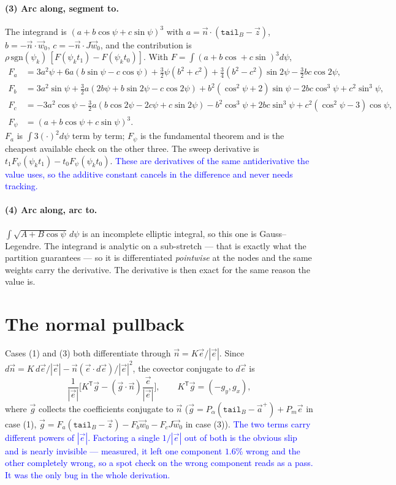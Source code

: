 \documentclass[11pt]{article}
\newcommand{\vv}[1]{\vec{#1}}
\newcommand{\code}[1]{\texttt{#1}}
\newcommand{\note}[1]{\textcolor{blue}{#1}}
\begin{document}
\paragraph{(3) Arc along, segment to.} The integrand is
$(a+b\cos\psi+c\sin\psi)^3$ with $a=\vv n\cdot(\code{tail}_B-\vv z)$, $b=-\vv n\cdot\vv w_0$,
$c=-\vv n\cdot J\vv w_0$, and the contribution is $\rho\,\mathrm{sgn}(\psi_k)\,[F(\psi_kt_1)-F(\psi_kt_0)]$.
With $F=\int(a+b\cos+c\sin)^3d\psi$,
\begin{align}
  F_a&=3a^2\psi+6a(b\sin\psi-c\cos\psi)+\tfrac32\psi(b^2+c^2)
       +\tfrac34(b^2-c^2)\sin2\psi-\tfrac32 bc\cos2\psi,\\
  F_b&=3a^2\sin\psi+\tfrac32 a(2b\psi+b\sin2\psi-c\cos2\psi)
       +b^2(\cos^2\!\psi+2)\sin\psi-2bc\cos^3\!\psi+c^2\sin^3\!\psi,\\
  F_c&=-3a^2\cos\psi-\tfrac32 a(b\cos2\psi-2c\psi+c\sin2\psi)
       -b^2\cos^3\!\psi+2bc\sin^3\!\psi+c^2(\cos^2\!\psi-3)\cos\psi,\\
  F_\psi&=(a+b\cos\psi+c\sin\psi)^3 .
\end{align}
$F_a$ is $\int 3(\cdot)^2d\psi$ term by term; $F_\psi$ is the fundamental theorem and is the cheapest
available check on the other three. The sweep derivative is $t_1F_\psi(\psi_kt_1)-t_0F_\psi(\psi_kt_0)$.
\note{These are derivatives of the same antiderivative the value uses, so the additive constant
cancels in the difference and never needs tracking.}

\paragraph{(4) Arc along, arc to.} $\int\!\sqrt{A+B\cos\psi}\,d\psi$ is an incomplete elliptic
integral, so this one is Gauss--Legendre. The integrand is analytic on a sub-stretch --- that is
exactly what the partition guarantees --- so it is differentiated \emph{pointwise} at the nodes and
the same weights carry the derivative. The derivative is then exact for the same reason the value is.

\section{The normal pullback}

Cases (1) and (3) both differentiate through $\vv n=K\vv e/|\vv e|$. Since
$d\vv n=K\,d\vv e/|\vv e|-\vv n(\vv e\cdot d\vv e)/|\vv e|^2$, the covector conjugate to $d\vv e$ is
\begin{equation}
  \frac{1}{|\vv e|}\Big[K^{\mathsf T}\vv g-(\vv g\cdot\vv n)\frac{\vv e}{|\vv e|}\Big],
  \qquad K^{\mathsf T}\vv g=(-g_y,g_x),
\end{equation}
where $\vv g$ collects the coefficients conjugate to $\vv n$
($\vv g=P_\alpha(\code{tail}_B-\vv a^+)+P_m\vv e$ in case (1),
$\vv g=F_a(\code{tail}_B-\vv z)-F_b\vv w_0-F_cJ\vv w_0$ in case (3)).
\note{The two terms carry different powers of $|\vv e|$. Factoring a single $1/|\vv e|$ out of both is
the obvious slip and is nearly invisible --- measured, it left one component $1.6\%$ wrong and the
other completely wrong, so a spot check on the wrong component reads as a pass. It was the only bug in
the whole derivation.}
\end{document}
